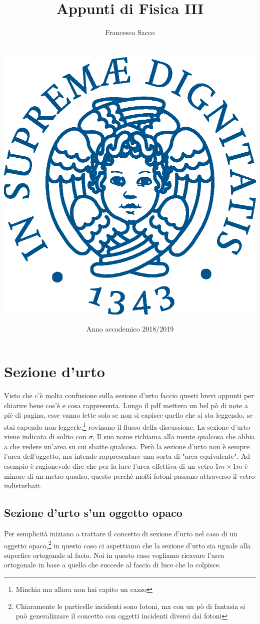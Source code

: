 \documentclass[11pt,a4paper]{report}
\date{{\LARGE Anno accademico 2018/2019}}
\title{{\myfont Appunti di Fisica III}}
\author{{\Huge Francesco Sacco}\\ \\ \\
		\includegraphics[scale=0.8]{Immagini/cherubino.eps}\\}
\begin{document}
\maketitle
\tableofcontents
\newpage
\chapter{Sezione d'urto}
	Visto che c'è molta confusione sulla sezione d'urto faccio questi brevi appunti per chiarire bene cos'è e cosa rappresenta.\newline
	Lungo il pdf mettero un bel pò di note a piè di pagina, esse vanno lette solo se non si capisce quello che si sta leggendo, se stai capendo non leggerle,\footnote{Minchia ma allora non hai capito un cazzo} rovinano il flusso della discussione.\newline 
	La sezione d'urto viene indicata di solito con $\sigma$, Il suo nome richiama alla mente qualcosa che abbia a che vedere un'area su cui sbatte qualcosa. Però la sezione d'urto non è sempre l'area dell'oggetto, ma intende rappresentare una sorta di "area equivalente".\newline
	Ad esempio è ragionevole dire che per la luce l'area effettiva di un vetro $1m\times 1m$ è minore di un metro quadro, questo perchè molti fotoni passano attraverso il vetro indisturbati.\newline
	\section{Sezione d'urto s'un oggetto opaco}
	\label{sec:opaco}
		Per semplicità iniziano a trattare il concetto di sezione d'urto nel caso di un oggetto opaco,\footnote{Chiaramente le particelle incidenti sono fotoni, ma con un pò di fantasia si può generalizzare il concetto con oggetti incidenti diversi dai fotoni} in questo caso ci aspettiamo che la sezione d'urto sia uguale alla superfice ortogonale al facio.\newline
		Noi in questo caso vogliamo ricavare l'area ortogonale in base a quello che succede al fascio di luce che lo colpisce.\newline
\end{document}
